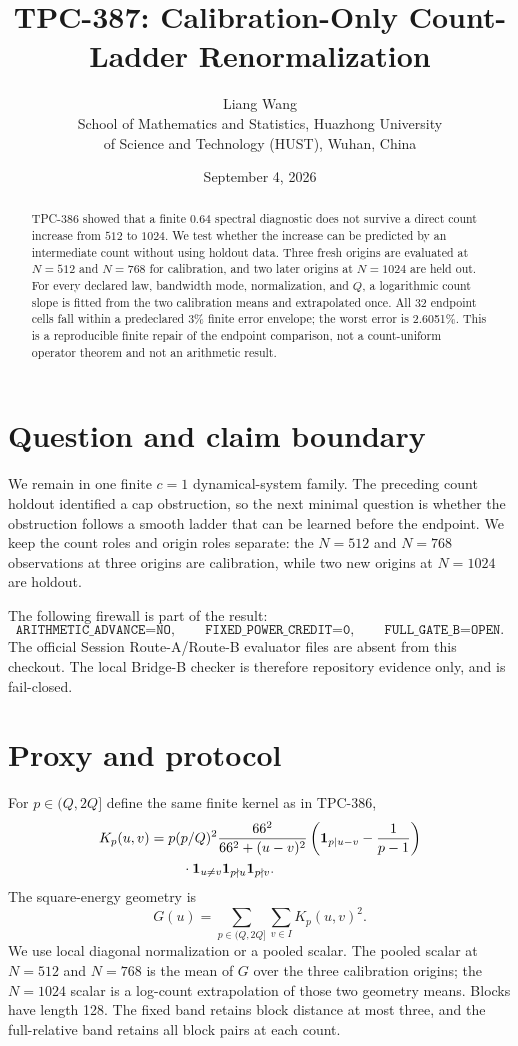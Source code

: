\documentclass[10pt]{article}
\title{TPC-387: Calibration-Only Count-Ladder Renormalization}
\author{Liang Wang\\
School of Mathematics and Statistics, Huazhong University\\
of Science and Technology (HUST), Wuhan, China}
\date{September 4, 2026}
\begin{document}
\maketitle

\begin{abstract}
TPC-386 showed that a finite $0.64$ spectral diagnostic does not survive a
direct count increase from $512$ to $1024$.  We test whether the increase can
be predicted by an intermediate count without using holdout data.  Three
fresh origins are evaluated at $N=512$ and $N=768$ for calibration, and two
later origins at $N=1024$ are held out.  For every declared law, bandwidth
mode, normalization, and $Q$, a logarithmic count slope is fitted from the
two calibration means and extrapolated once.  All 32 endpoint cells fall
within a predeclared 3\% finite error envelope; the worst error is 2.6051\%.
This is a reproducible finite repair of the endpoint comparison, not a
count-uniform operator theorem and not an arithmetic result.
\end{abstract}

\section{Question and claim boundary}

We remain in one finite $c=1$ dynamical-system family.  The preceding count
holdout identified a cap obstruction, so the next minimal question is whether
the obstruction follows a smooth ladder that can be learned before the
endpoint.  We keep the count roles and origin roles separate: the $N=512$ and
$N=768$ observations at three origins are calibration, while two new origins
at $N=1024$ are holdout.

The following firewall is part of the result:
\[
 \texttt{ARITHMETIC\_ADVANCE=NO},\qquad
 \texttt{FIXED\_POWER\_CREDIT=0},\qquad
 \texttt{FULL\_GATE\_B=OPEN}.
\]
The official Session Route-A/Route-B evaluator files are absent from this
checkout.  The local Bridge-B checker is therefore repository evidence only,
and is fail-closed.

\section{Proxy and protocol}

For $p\in(Q,2Q]$ define the same finite kernel as in TPC-386,
\begin{align*}
 K_p(u,v)={}&p(p/Q)^2\frac{66^2}{66^2+(u-v)^2}
 \left({\bf 1}_{p\mid u-v}-\frac{1}{p-1}\right)\\
 &\quad\cdot{\bf 1}_{u\ne v}{\bf 1}_{p\nmid u}{\bf 1}_{p\nmid v}.
\end{align*}
The square-energy geometry is
\[
 G(u)=\sum_{p\in(Q,2Q]}\sum_{v\in I}K_p(u,v)^2.
\]
We use local diagonal normalization or a pooled scalar.  The pooled scalar at
$N=512$ and $N=768$ is the mean of $G$ over the three calibration origins;
the $N=1024$ scalar is a log-count extrapolation of those two geometry means.
Blocks have length 128.  The fixed band retains block distance at most three,
and the full-relative band retains all block pairs at each count.
\end{document}
